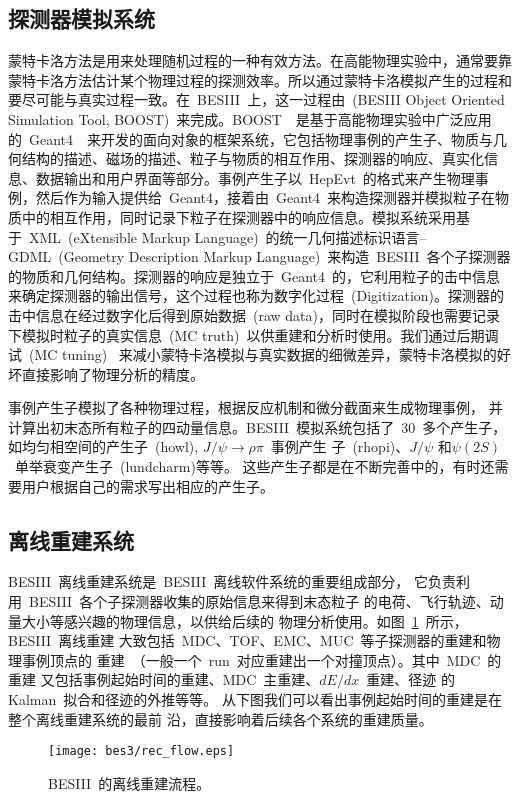 \subsection{探测器模拟系统}
蒙特卡洛方法是用来处理随机过程的一种有效方法。在高能物理实验中，通常要靠蒙特卡洛方法估计某个物理过程的探测效率。所以通过蒙特卡洛模拟产生的过程和要尽可能与真实过程一致。在~BESIII~上，这一过程由~(BESIII
Object Oriented Simulation Tool, BOOST)~来完成。BOOST~\cite{BOOST}~是基于高能物理实验中广泛应用的~Geant4~\cite{Ablikim:2009aa}~来开发的面向对象的框架系统，它包括物理事例的产生子、物质与几何结构的描述、磁场的描述、粒子与物质的相互作用、探测器的响应、真实化信息、数据输出和用户界面等部分。事例产生子以~HepEvt~的格式来产生物理事例，然后作为输入提供给~Geant4，接着由~Geant4~来构造探测器并模拟粒子在物质中的相互作用，同时记录下粒子在探测器中的响应信息。模拟系统采用基于~XML~(eXtensible Markup Language)~的统一几何描述标识语言--GDML~(Geometry Description Markup Language)~来构造~BESIII~各个子探测器的物质和几何结构。探测器的响应是独立于~Geant4~的，它利用粒子的击中信息来确定探测器的输出信号，这个过程也称为数字化过程~(Digitization)。探测器的击中信息在经过数字化后得到原始数据~(raw data)，同时在模拟阶段也需要记录下模拟时粒子的真实信息~(MC truth)~以供重建和分析时使用。我们通过后期调试~(MC tuning)~ 来减小蒙特卡洛模拟与真实数据的细微差异，蒙特卡洛模拟的好坏直接影响了物理分析的精度。

事例产生子模拟了各种物理过程，根据反应机制和微分截面来生成物理事例，
并计算出初末态所有粒子的四动量信息。BESIII~模拟系统包括了~30~多个产生子，
如均匀相空间的产生子~(howl), $J/\psi\rightarrow\rho\pi$~事例产生
子~(rhopi)、$J/\psi$ 和$\psi(2S)$~单举衰变产生子~(lundcharm)等等。
这些产生子都是在不断完善中的，有时还需要用户根据自己的需求写出相应的产生子。

\subsection{离线重建系统}
BESIII~离线重建系统是~BESIII~离线软件系统的重要组成部分，
它负责利用~BESIII~各个子探测器收集的原始信息来得到末态粒子
的电荷、飞行轨迹、动量大小等感兴趣的物理信息，以供给后续的
物理分析使用。如图~\ref{fig:rec_flow}~所示，BESIII~离线重建
大致包括~MDC、TOF、EMC、MUC~等子探测器的重建和物理事例顶点的
重建~（一般一个~run~对应重建出一个对撞顶点）。其中~MDC~的重建
又包括事例起始时间的重建、MDC~主重建、$dE/dx$~重建、径迹
的Kalman~拟合和径迹的外推等等。
从下图我们可以看出事例起始时间的重建是在整个离线重建系统的最前
沿，直接影响着后续各个系统的重建质量。
\begin{figure}
\begin{center}
 \texttt{[image: bes3/rec\_flow.eps]}
 \caption{BESIII~的离线重建流程。}
 \label{fig:rec_flow}
 \end{center}
\end{figure}

